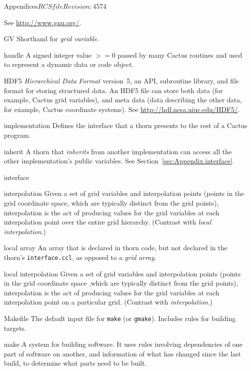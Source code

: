 \begin{cactuspart}{Appendices}{$RCSfile$}{$Revision: 4574 $}
\begin{Lentry}
  See \url{http://www.gnu.org/}.
\item[GV]
  Shorthand for \textit{grid variable}.
\item[handle]
  A signed integer value $>= 0$ passed by many Cactus routines and
  used to represent a dynamic data or code object.
\item[HDF5]
  \textit{Hierarchical Data Format} version~5, an API, subroutine library, and
  file format for storing structured data.  An HDF5 file can
  store both data (for example, Cactus grid variables), and meta data
  (data describing the other data, for example, Cactus coordinate
  systems).
  See %
  \url{http://hdf.ncsa.uiuc.edu/HDF5/}.
\item[implementation]
  Defines the interface that a thorn presents to the rest of a Cactus program.
\item[inherit] A thorn that \textit{inherits} from another implementation
  can access all the other implementation's public variables.
  See Section~\ref{sec:Appendix.interface}.
\item[interface]
\item[interpolation]
  Given a set of grid variables and interpolation points (points in the
  grid coordinate space, which are typically distinct from the grid points),
  interpolation is the act of producing values for the grid variables 
  at each interpolation point over the entire grid hierarchy.  
  (Contrast with \textit{local interpolation}.)
\item[local array]
  An array that is declared in thorn code, but not declared in the thorn's
  \verb|interface.ccl|, as opposed to a \textit{grid array}.
\item[local interpolation]
  Given a set of grid variables and interpolation points (points in the
  grid coordinate space ,which are typically distinct from the grid points),
  interpolation is the act of producing values for the grid variables
  at each interpolation point on a particular grid.  
  (Contrast with \textit{interpolation}.)
\item[Makefile]
  The default input file for \texttt{make} (or \texttt{gmake}).  Includes
  rules for building targets.
\item[make] A system for building software.  It uses rules involving
  dependencies of one part of software on another, and information of what
  has changed since the last build, to determine what parts need to be
  built.

\end{Lentry}
\end{cactuspart}
